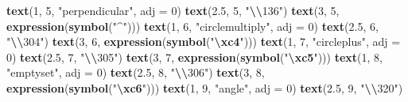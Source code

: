 \documentclass[
]{book}
\newenvironment{Shaded}{\begin{snugshade}}{\end{snugshade}}
\newcommand{\AttributeTok}[1]{\textcolor[rgb]{0.13,0.29,0.53}{#1}}
\newcommand{\DecValTok}[1]{\textcolor[rgb]{0.00,0.00,0.81}{#1}}
\newcommand{\FloatTok}[1]{\textcolor[rgb]{0.00,0.00,0.81}{#1}}
\newcommand{\FunctionTok}[1]{\textcolor[rgb]{0.13,0.29,0.53}{\textbf{#1}}}
\newcommand{\NormalTok}[1]{#1}
\newcommand{\SpecialCharTok}[1]{\textcolor[rgb]{0.81,0.36,0.00}{\textbf{#1}}}
\newcommand{\StringTok}[1]{\textcolor[rgb]{0.31,0.60,0.02}{#1}}
\begin{document}
\begin{Shaded}
\begin{Highlighting}[]
\FunctionTok{text}\NormalTok{(}\DecValTok{1}\NormalTok{, }\DecValTok{5}\NormalTok{, }\StringTok{"perpendicular"}\NormalTok{, }\AttributeTok{adj =} \DecValTok{0}\NormalTok{)}
\FunctionTok{text}\NormalTok{(}\FloatTok{2.5}\NormalTok{, }\DecValTok{5}\NormalTok{, }\StringTok{"}\SpecialCharTok{\textbackslash{}\textbackslash{}}\StringTok{136"}\NormalTok{)}
\FunctionTok{text}\NormalTok{(}\DecValTok{3}\NormalTok{, }\DecValTok{5}\NormalTok{, }\FunctionTok{expression}\NormalTok{(}\FunctionTok{symbol}\NormalTok{(}\StringTok{"\^{}"}\NormalTok{)))}
\FunctionTok{text}\NormalTok{(}\DecValTok{1}\NormalTok{, }\DecValTok{6}\NormalTok{, }\StringTok{"circlemultiply"}\NormalTok{, }\AttributeTok{adj =} \DecValTok{0}\NormalTok{)}
\FunctionTok{text}\NormalTok{(}\FloatTok{2.5}\NormalTok{, }\DecValTok{6}\NormalTok{, }\StringTok{"}\SpecialCharTok{\textbackslash{}\textbackslash{}}\StringTok{304"}\NormalTok{)}
\FunctionTok{text}\NormalTok{(}\DecValTok{3}\NormalTok{, }\DecValTok{6}\NormalTok{, }\FunctionTok{expression}\NormalTok{(}\FunctionTok{symbol}\NormalTok{(}\StringTok{"}\SpecialCharTok{\textbackslash{}xc4}\StringTok{"}\NormalTok{)))}
\FunctionTok{text}\NormalTok{(}\DecValTok{1}\NormalTok{, }\DecValTok{7}\NormalTok{, }\StringTok{"circleplus"}\NormalTok{, }\AttributeTok{adj =} \DecValTok{0}\NormalTok{)}
\FunctionTok{text}\NormalTok{(}\FloatTok{2.5}\NormalTok{, }\DecValTok{7}\NormalTok{, }\StringTok{"}\SpecialCharTok{\textbackslash{}\textbackslash{}}\StringTok{305"}\NormalTok{)}
\FunctionTok{text}\NormalTok{(}\DecValTok{3}\NormalTok{, }\DecValTok{7}\NormalTok{, }\FunctionTok{expression}\NormalTok{(}\FunctionTok{symbol}\NormalTok{(}\StringTok{"}\SpecialCharTok{\textbackslash{}xc5}\StringTok{"}\NormalTok{)))}
\FunctionTok{text}\NormalTok{(}\DecValTok{1}\NormalTok{, }\DecValTok{8}\NormalTok{, }\StringTok{"emptyset"}\NormalTok{, }\AttributeTok{adj =} \DecValTok{0}\NormalTok{)}
\FunctionTok{text}\NormalTok{(}\FloatTok{2.5}\NormalTok{, }\DecValTok{8}\NormalTok{, }\StringTok{"}\SpecialCharTok{\textbackslash{}\textbackslash{}}\StringTok{306"}\NormalTok{)}
\FunctionTok{text}\NormalTok{(}\DecValTok{3}\NormalTok{, }\DecValTok{8}\NormalTok{, }\FunctionTok{expression}\NormalTok{(}\FunctionTok{symbol}\NormalTok{(}\StringTok{"}\SpecialCharTok{\textbackslash{}xc6}\StringTok{"}\NormalTok{)))}
\FunctionTok{text}\NormalTok{(}\DecValTok{1}\NormalTok{, }\DecValTok{9}\NormalTok{, }\StringTok{"angle"}\NormalTok{, }\AttributeTok{adj =} \DecValTok{0}\NormalTok{)}
\FunctionTok{text}\NormalTok{(}\FloatTok{2.5}\NormalTok{, }\DecValTok{9}\NormalTok{, }\StringTok{"}\SpecialCharTok{\textbackslash{}\textbackslash{}}\StringTok{320"}\NormalTok{)}

\end{Highlighting}
\end{Shaded}
\end{document}
